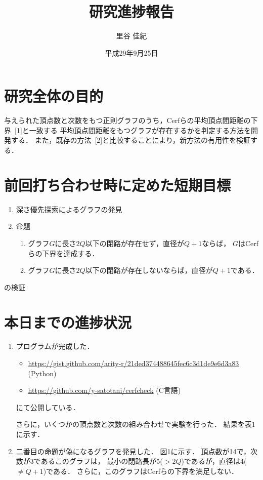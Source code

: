 \documentclass[xelatex,ja=standard,11pt]{bxjsarticle}
\title{研究進捗報告}
\author{里谷 佳紀}
\date{平成29年9月25日}
\providecommand{\tightlist}{%
  \setlength{\itemsep}{0pt}\setlength{\parskip}{0pt}}
\begin{document}
\maketitle

\section{研究全体の目的}

与えられた頂点数と次数をもつ正則グラフのうち，Cerfらの平均頂点間距離の下界~{[}1{]}と一致する
平均頂点間距離をもつグラフが存在するかを判定する方法を開発する．
また，既存の方法~{[}2{]}と比較することにより，新方法の有用性を検証する．

\section{前回打ち合わせ時に定めた短期目標}

\begin{enumerate}
\def\labelenumi{\arabic{enumi}.}
\tightlist
\item
  深さ優先探索によるグラフの発見
\item
  命題

  \begin{enumerate}
  \def\labelenumii{\alph{enumii}.}
  \tightlist
  \item
    グラフ\(G\)に長さ\(2Q\)以下の閉路が存在せず，直径が\(Q+1\)ならば，
    \(G\)はCerfらの下界を達成する．
  \item
    グラフ\(G\)に長さ\(2Q\)以下の閉路が存在しないならば，直径が\(Q+1\)である．
  \end{enumerate}
\end{enumerate}

の検証

\section{本日までの進捗状況}

\begin{enumerate}
\def\labelenumi{\arabic{enumi}.}
\item
  プログラムが完成した．

  \begin{itemize}
  \tightlist
  \item
    \url{https://gist.github.com/arity-r/21ded374488645fec6c3d1de9e6d3a83}
    (Python)
  \item
    \url{https://github.com/y-satotani/cerfcheck} (C言語)
  \end{itemize}

  にて公開している．

  さらに，いくつかの頂点数と次数の組み合わせで実験を行った．
  結果を表1に示す．
\item
  二番目の命題が偽になるグラフを発見した． 図1に示す．
  頂点数が14で，次数が3であるこのグラフは，
  最小の閉路長が5(\(>2Q\))であるが，直径は4(\(\neq Q+1\))である．
  さらに，このグラフはCerfらの下界を満足しない．
\end{enumerate}
\end{document}
